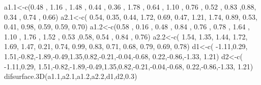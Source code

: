 \begin{Examples}
\begin{ExampleCode}
a1.1<-c(0.48 , 1.16 , 1.48 , 0.44 , 0.36 , 1.78 , 0.64 , 1.10 , 0.76 , 0.52 , 0.83 ,0.88, 0.34 , 0.74 , 0.66)
a2.1<-c( 0.54, 0.35, 0.44, 1.72, 0.69, 0.47, 1.21, 1.74, 0.89, 0.53, 0.41, 0.98, 0.59, 0.59, 0.70)
a1.2<-c(0.58 , 0.16 , 0.48 , 0.84 , 0.76 , 0.78 , 1.64 , 1.10 , 1.76 , 1.52 , 0.53 ,0.58, 0.54 , 0.84 , 0.76)
a2.2<-c( 1.54, 1.35, 1.44, 1.72, 1.69, 1.47, 0.21, 0.74, 0.99, 0.83, 0.71, 0.68, 0.79, 0.69, 0.78)
d1<-c( -1.11,0.29, 1.51,-0.82,-1.89,-0.49,1.35,0.82,-0.21,-0.04,-0.68, 0.22,-0.86,-1.33, 1.21)
d2<-c( -1.11,0.29, 1.51,-0.82,-1.89,-0.49,1.35,0.82,-0.21,-0.04,-0.68, 0.22,-0.86,-1.33, 1.21)
difsurface.3D(a1.1,a2.1,a1.2,a2.2,d1,d2,0.3)
\end{ExampleCode}
\end{Examples}

